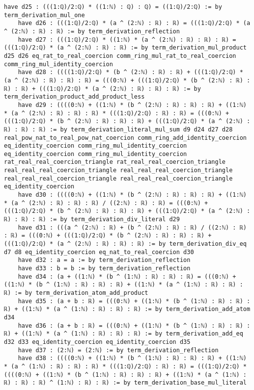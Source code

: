 \documentclass{article}
\begin{document}
\begin{tcolorbox}[colback=white!10, width=\linewidth]
\begin{lstlisting}[language=Lean4]
    have d25 : (((1:ℚ)/2:ℚ) * ((1:ℕ) : ℚ) : ℚ) = ((1:ℚ)/2:ℚ) := by term_derivation_mul_one
    have d26 : (((1:ℚ)/2:ℚ) * (a ^ (2:ℕ) : ℝ) : ℝ) = (((1:ℚ)/2:ℚ) * (a ^ (2:ℕ) : ℝ) : ℝ) := by term_derivation_reflection
    have d27 : (((1:ℚ)/2:ℚ) * ((1:ℕ) * (a ^ (2:ℕ) : ℝ) : ℝ) : ℝ) = (((1:ℚ)/2:ℚ) * (a ^ (2:ℕ) : ℝ) : ℝ) := by term_derivation_mul_product d25 d26 eq_rat_to_real_coercion comm_ring_mul_rat_to_real_coercion comm_ring_mul_identity_coercion
    have d28 : ((((1:ℚ)/2:ℚ) * (b ^ (2:ℕ) : ℝ) : ℝ) + (((1:ℚ)/2:ℚ) * (a ^ (2:ℕ) : ℝ) : ℝ) : ℝ) = (((0:ℕ) + (((1:ℚ)/2:ℚ) * (b ^ (2:ℕ) : ℝ) : ℝ) : ℝ) + (((1:ℚ)/2:ℚ) * (a ^ (2:ℕ) : ℝ) : ℝ) : ℝ) := by term_derivation_product_add_product_less
    have d29 : ((((0:ℕ) + ((1:ℕ) * (b ^ (2:ℕ) : ℝ) : ℝ) : ℝ) + ((1:ℕ) * (a ^ (2:ℕ) : ℝ) : ℝ) : ℝ) * (((1:ℚ)/2:ℚ) : ℝ) : ℝ) = (((0:ℕ) + (((1:ℚ)/2:ℚ) * (b ^ (2:ℕ) : ℝ) : ℝ) : ℝ) + (((1:ℚ)/2:ℚ) * (a ^ (2:ℕ) : ℝ) : ℝ) : ℝ) := by term_derivation_literal_mul_sum d9 d24 d27 d28 real_pow_nat_to_real_pow_nat_coercion comm_ring_add_identity_coercion eq_identity_coercion comm_ring_mul_identity_coercion eq_identity_coercion comm_ring_mul_identity_coercion rat_real_real_coercion_triangle rat_real_real_coercion_triangle real_real_real_coercion_triangle real_real_real_coercion_triangle real_real_real_coercion_triangle real_real_real_coercion_triangle eq_identity_coercion
    have d30 : ((((0:ℕ) + ((1:ℕ) * (b ^ (2:ℕ) : ℝ) : ℝ) : ℝ) + ((1:ℕ) * (a ^ (2:ℕ) : ℝ) : ℝ) : ℝ) / ((2:ℕ) : ℝ) : ℝ) = (((0:ℕ) + (((1:ℚ)/2:ℚ) * (b ^ (2:ℕ) : ℝ) : ℝ) : ℝ) + (((1:ℚ)/2:ℚ) * (a ^ (2:ℕ) : ℝ) : ℝ) : ℝ) := by term_derivation_div_literal d29
    have d31 : (((a ^ (2:ℕ) : ℝ) + (b ^ (2:ℕ) : ℝ) : ℝ) / ((2:ℕ) : ℝ) : ℝ) = (((0:ℕ) + (((1:ℚ)/2:ℚ) * (b ^ (2:ℕ) : ℝ) : ℝ) : ℝ) + (((1:ℚ)/2:ℚ) * (a ^ (2:ℕ) : ℝ) : ℝ) : ℝ) := by term_derivation_div_eq d7 d8 eq_identity_coercion eq_nat_to_real_coercion d30
    have d32 : a = a := by term_derivation_reflection
    have d33 : b = b := by term_derivation_reflection
    have d34 : (a + ((1:ℕ) * (b ^ (1:ℕ) : ℝ) : ℝ) : ℝ) = (((0:ℕ) + ((1:ℕ) * (b ^ (1:ℕ) : ℝ) : ℝ) : ℝ) + ((1:ℕ) * (a ^ (1:ℕ) : ℝ) : ℝ) : ℝ) := by term_derivation_atom_add_product
    have d35 : (a + b : ℝ) = (((0:ℕ) + ((1:ℕ) * (b ^ (1:ℕ) : ℝ) : ℝ) : ℝ) + ((1:ℕ) * (a ^ (1:ℕ) : ℝ) : ℝ) : ℝ) := by term_derivation_add_atom d34
    have d36 : (a + b : ℝ) = (((0:ℕ) + ((1:ℕ) * (b ^ (1:ℕ) : ℝ) : ℝ) : ℝ) + ((1:ℕ) * (a ^ (1:ℕ) : ℝ) : ℝ) : ℝ) := by term_derivation_add_eq d32 d33 eq_identity_coercion eq_identity_coercion d35
    have d37 : (2:ℕ) = (2:ℕ) := by term_derivation_reflection
    have d38 : ((((0:ℕ) + ((1:ℕ) * (b ^ (1:ℕ) : ℝ) : ℝ) : ℝ) + ((1:ℕ) * (a ^ (1:ℕ) : ℝ) : ℝ) : ℝ) * (((1:ℚ)/2:ℚ) : ℝ) : ℝ) = (((1:ℚ)/2:ℚ) * ((((0:ℕ) + ((1:ℕ) * (b ^ (1:ℕ) : ℝ) : ℝ) : ℝ) + ((1:ℕ) * (a ^ (1:ℕ) : ℝ) : ℝ) : ℝ) ^ (1:ℕ) : ℝ) : ℝ) := by term_derivation_base_mul_literal

\end{lstlisting}
\end{tcolorbox}
\end{document}
